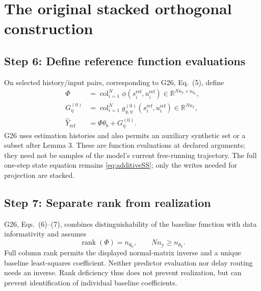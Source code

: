 \documentclass[11pt,a4paper]{article}
\newcommand{\R}{\mathbb R}
\newcommand{\col}{\operatorname{col}}
\newcommand{\rank}{\operatorname{rank}}
\newcommand{\refset}{\mathrm{ref}}
\begin{document}
\section{The original stacked orthogonal construction}
\subsection*{Step 6: Define reference function evaluations}
On selected history/input pairs, corresponding to G26, Eq.\ (5), define
\begin{equation}\label{eq:originalstacks}
\begin{aligned}
\Phi&=\col_{i=1}^N\phi(s_i^{\refset},u_i^{\refset})\in\R^{Nn_{\mathrm y}\times n_{\theta_{\mathrm b}}},\\
G_\eta^{(0)}&=\col_{i=1}^N g_{y,\eta}^{(0)}(s_i^{\refset},u_i^{\refset})\in\R^{Nn_{\mathrm y}},\\
\hat Y_{\refset}&=\Phi\theta_b+G_\eta^{(0)}.
\end{aligned}
\end{equation}
G26 uses estimation histories and also permits an auxiliary synthetic set or a subset after Lemma 3. These are function evaluations at declared arguments; they need not be samples of the model's current free-running trajectory. The full one-step state equation remains \eqref{eq:additiveSS}; only the writes needed for projection are stacked.

\subsection*{Step 7: Separate rank from realization}
G26, Eqs.\ (6)--(7), combines distinguishability of the baseline function with data informativity and assumes
\begin{equation}\label{eq:rank}
\rank(\Phi)=n_{\theta_{\mathrm b}},\qquad Nn_{\mathrm y}\ge n_{\theta_{\mathrm b}}.
\end{equation}
Full column rank permits the displayed normal-matrix inverse and a unique baseline least-squares coefficient. Neither predictor evaluation nor delay routing needs an inverse. Rank deficiency thus does not prevent realization, but can prevent identification of individual baseline coefficients.
\end{document}
